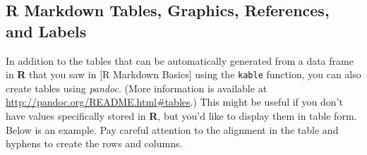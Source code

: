 \documentclass[12pt,oneside]{chicagocapstone}
\begin{document}
\newpage

\subsection*{R Markdown Tables, Graphics, References, and
Labels}\label{ref-labels}

In addition to the tables that can be automatically generated from a
data frame in \textbf{R} that you saw in {[}R Markdown Basics{]} using
the \texttt{kable} function, you can also create tables using
\emph{pandoc}. (More information is available at
\url{http://pandoc.org/README.html\#tables}.) This might be useful if
you don't have values specifically stored in \textbf{R}, but you'd like
to display them in table form. Below is an example. Pay careful
attention to the alignment in the table and hyphens to create the rows
and columns.
\end{document}
